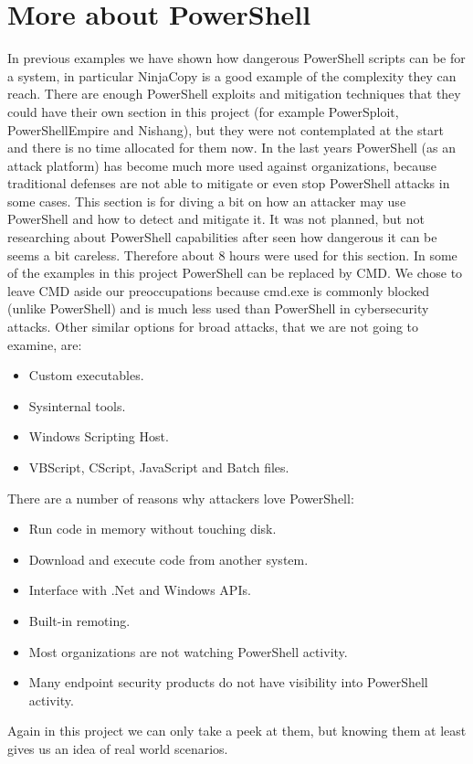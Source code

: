 \section{More about PowerShell}
In previous examples we have shown how dangerous PowerShell scripts can be for a system, in particular NinjaCopy is a good example of the complexity they can reach.
\linej
There are enough PowerShell exploits and mitigation techniques that they could have their own section in this project (for example PowerSploit, PowerShellEmpire and Nishang), but they were not contemplated at the start and there is no time allocated for them now.
In the last years PowerShell (as an attack platform) has become much more used against organizations, because traditional defenses are not able to mitigate or even stop PowerShell attacks in some cases.
\linej
This section is for diving a bit on how an attacker may use PowerShell and how to detect and mitigate it. It was not planned, but not researching about PowerShell capabilities after seen how dangerous it can be seems a bit careless. Therefore about 8 hours were used for this section.
\linej
\linej
In some of the examples in this project PowerShell can be replaced by CMD.
We chose to leave CMD aside our preoccupations because cmd.exe is commonly blocked (unlike PowerShell) and is much less used than PowerShell in cybersecurity attacks.
\linej
\linej
Other similar options for broad attacks, that we are not going to examine, are\cite{powershell_adsecurity}:
\begin{itemize}
\item Custom executables.
\item Sysinternal tools.
\item Windows Scripting Host.
\item VBScript, CScript, JavaScript and Batch files.
\end{itemize}
\linej
There are a number of reasons why attackers love PowerShell\cite{powershell_adsecurity}:
\begin{itemize}
\item Run code in memory without touching disk.
\item Download and execute code from another system.
\item Interface with .Net and Windows APIs.
\item Built-in remoting.
\item Most organizations are not watching PowerShell activity.
\item Many endpoint security products do not have visibility into PowerShell activity.
\end{itemize}
\linej
Again in this project we can only take a peek at them, but knowing them at least gives us an idea of real world scenarios.

